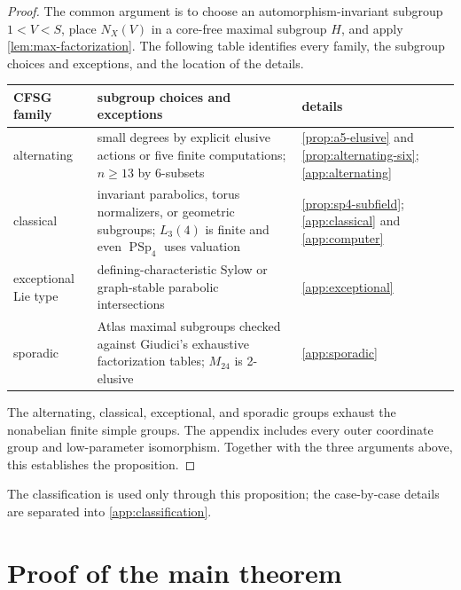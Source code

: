 \documentclass[11pt]{amsart}
\newcommand{\PSp}{\operatorname{PSp}}
\theoremstyle{definition}
\begin{document}
\begin{proof}
The common argument is to choose an automorphism-invariant subgroup
\(1<V<S\), place \(N_X(V)\) in a core-free maximal subgroup \(H\), and apply
\cref{lem:max-factorization}.  The following table identifies every family,
the subgroup choices and exceptions, and the location of the details.

\begin{center}
\small
\begin{tabular}{>{\raggedright\arraybackslash}p{}
                >{\raggedright\arraybackslash}p{}
                >{\raggedright\arraybackslash}p{}}
\toprule
CFSG family & subgroup choices and exceptions & details \\
\midrule
alternating & small degrees by explicit elusive actions or five finite
computations; \(n\ge13\) by 6-subsets &
\cref{prop:a5-elusive} and \cref{prop:alternating-six}; \cref{app:alternating} \\
classical & invariant parabolics, torus normalizers, or geometric subgroups;
\(L_3(4)\) is finite and even \(\PSp_4\) uses valuation &
\cref{prop:sp4-subfield}; \cref{app:classical} and \cref{app:computer} \\
exceptional Lie type & defining-characteristic Sylow or graph-stable
parabolic intersections & \cref{app:exceptional} \\
sporadic & Atlas maximal subgroups checked against Giudici's exhaustive
factorization tables; \(M_{24}\) is 2-elusive & \cref{app:sporadic} \\
\bottomrule
\end{tabular}
\end{center}

The alternating, classical, exceptional, and sporadic groups exhaust the
nonabelian finite simple groups.  The appendix includes every outer
coordinate group and low-parameter isomorphism.  Together with the three
arguments above, this establishes the proposition.
\end{proof}

The classification is used only through this proposition; the case-by-case
details are separated into \cref{app:classification}.

\section{Proof of the main theorem}\label{sec:main-proof}
\end{document}
